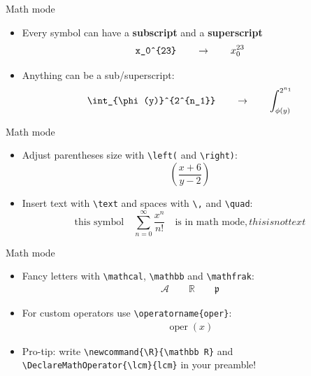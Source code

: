 \documentclass[11pt]{beamer}
\newcommand{\bs}{\textbackslash}
\begin{document}
\begin{frame}{Math mode}
  \begin{itemize}
    \item Every symbol can have a \textbf{subscript} and a \textbf{superscript}
          \begin{align*}
            \texttt{x\_0\^{}\{23\}} \qquad \to \qquad x_0^{23}
          \end{align*}
    \item Anything can be a sub/superscript:
          \begin{align*}
            \texttt{\bs int\_\{\bs phi (y)\}\^{}\{2\^{}\{n\_1\}\}}
            \qquad \to \qquad \int_{\phi(y)}^{2^{n_1}}
          \end{align*}
  \end{itemize}
\end{frame}


\begin{frame}{Math mode}
  \begin{itemize}
    \item Adjust parentheses size with \texttt{\bs left(} and
          \texttt{\bs right)}: \[\left(\frac{x+6}{y-2}\right)\]
    \item Insert text with \texttt{\bs text} and
          spaces with \texttt{\bs ,} and \texttt{\bs quad}:
          \[\text{this symbol}\quad \sum_{n=0}^\infty \frac{x^n}{n!} \quad
            \text{is in math mode}, this is not text\]
  \end{itemize}
\end{frame}

\begin{frame}{Math mode}
  
  \begin{itemize}
    \item Fancy letters with \texttt{\bs mathcal},
          \texttt{\bs mathbb} and \texttt{\bs mathfrak}:
          \begin{align*}
            \mathcal{A} \qquad \mathbb R \qquad \mathfrak p
          \end{align*}
    \item For custom operators use \texttt{\bs operatorname\{oper\}}:
          \begin{align*}
            \operatorname{oper}(x)
          \end{align*}
    \item Pro-tip: write \texttt{\bs newcommand\{\bs R\}\{\bs mathbb R\}} and
          \texttt{\bs DeclareMathOperator\{\bs lcm\}\{lcm\}} in your preamble!
  \end{itemize}
\end{frame}
\end{document}
